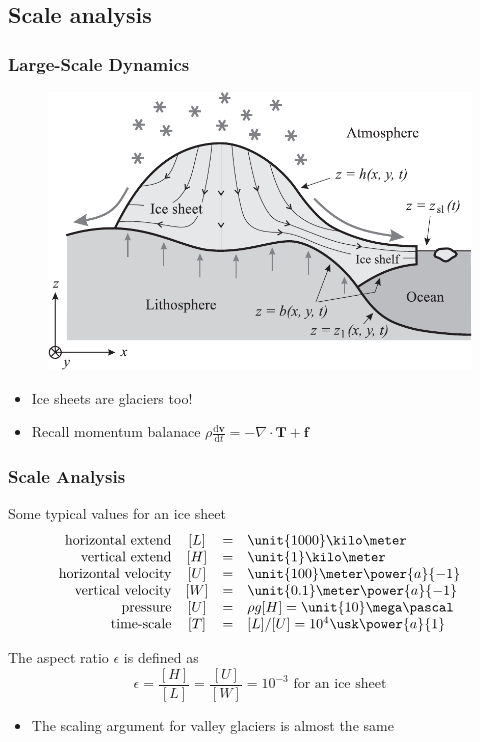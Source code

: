 \documentclass[hide notes,intlimits]{beamer}
\begin{document}
\subsection{Scale analysis}

\begin{frame}
  \frametitle{Large-Scale Dynamics}
  \begin{figure}
    \includegraphics[width=.55\textwidth]{figures/fig_5_01}%
  \end{figure}
 \begin{itemize}
    \item Ice sheets are glaciers too!
    \item Recall momentum balanace $\rho \frac{\text{d} \mathbf{v}}{\text{d} t}  =  -\nabla \cdot \mathbf{T} + \mathbf{f}$
  \end{itemize}
\end{frame}

\begin{frame}
  \frametitle{Scale Analysis}
  \begin{block}{Some typical values for an ice sheet}
  \begin{equation*}
  \begin{array}{rccl}
    \text{horizontal extend} &  [L] & = & \unit{1000}\kilo\meter\\
    \text{vertical extend} & [H] & = & \unit{1}\kilo\meter \\
    \text{horizontal velocity} & [U] & = & \unit{100}\meter\power{a}{-1}\\
    \text{vertical velocity} & [W] & = & \unit{0.1}\meter\power{a}{-1}\\
    \text{pressure} & [U] & = & \rho g[H] = \unit{10}\mega\pascal\\
    \text{time-scale} & [T] & = &[L]/[U] = 10^{4}\usk\power{a}{1}\\
  \end{array}
  \end{equation*}
  \end{block}
  The aspect ratio $\epsilon$ is defined as
  \begin{equation*}
    \epsilon = \frac{[H]}{[L]} = \frac{[U]}{[W]} = 10^{-3} \text{ for an ice sheet}
  \end{equation*}
  \begin{itemize}
    \item The scaling argument for valley glaciers is almost the same
  \end{itemize}
\end{frame}
\end{document}
